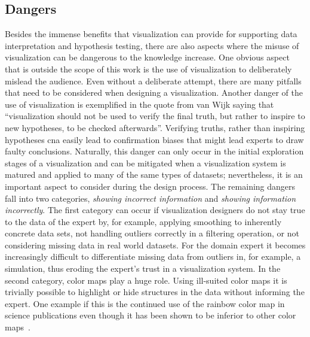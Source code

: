\subsection{Dangers} \label{cha:intro:vis:dangers}
Besides the immense benefits that visualization can provide for supporting data interpretation and hypothesis testing, there are also aspects where the misuse of visualization can be dangerous to the knowledge increase.  One obvious aspect that is outside the scope of this work is the use of visualization to deliberately mislead the audience.  Even without a deliberate attempt, there are many pitfalls that need to be considered when designing a visualization.  Another danger of the use of visualization is exemplified in the quote from van Wijk saying that ``visualization should not be used to verify the final truth, but rather to inspire to new hypotheses, to be checked afterwards''.  Verifying truths, rather than inspiring hypotheses cna easily lead to confirmation biases that might lead experts to draw faulty conclusions.  Naturally, this danger can only occur in the initial exploration stages of a visualization and can be mitigated when a visualization system is matured and applied to many of the same types of datasets; nevertheless, it is an important aspect to consider during the design process.  The remaining dangers fall into two categories, \emph{showing incorrect information} and \emph{showing information incorrectly}. The first category can occur if visualization designers do not stay true to the data of the expert by, for example, applying smoothing to inherently concrete data sets, not handling outliers correctly in a filtering operation, or not considering missing data in real world datasets.  For the domain expert it becomes increasingly difficult to differentiate missing data from outliers in, for example, a simulation, thus eroding the expert's trust in a visualization system.  In the second category, color maps play a huge role.  Using ill-suited color maps it is trivially possible to highlight or hide structures in the data without informing the expert.  One example if this is the continued use of the rainbow color map in science publications even though it has been shown to be inferior to other color maps~\cite{borland2007rainbow}.



